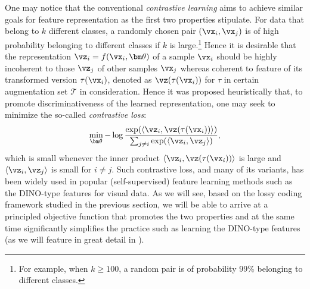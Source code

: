 \documentclass[../../book-main.tex]{subfiles}
\begin{document}
\begin{remark}
    One may notice that the conventional {\em contrastive learning}
    \citep{hadsell2006dimensionality,Van_den_Oord2018-qf,he2019momentum}
    aims to achieve similar goals for feature representation as the first
    two properties stipulate. For data that belong to $k$ different
    classes, a randomly chosen pair $(\vx_i, \vx_j)$ is of high probability
    belonging to different classes if $k$ is large.\footnote{For
        example, when $k \ge 100$, a random pair is of probability 99\%
    belonging to different classes.} Hence it is desirable that the
    representation $\vz_i = f(\vx_i, \bm \theta)$ of a sample $\vx_i$ should
    be highly incoherent to those $\vz_j$ of other samples $\vx_j$ whereas
    coherent to feature of its transformed version $\tau(\vx_i)$, denoted
    as $\vz(\tau(\vx_i))$ for $\tau$ in certain augmentation set $\mathcal
    T$ in consideration. Hence it was proposed heuristically that, to
    promote  discriminativeness of the learned representation, one may
    seek to minimize the so-called {\em contrastive loss}:
    \begin{equation}
        \min_{\bm \theta} - \log \frac{\exp(\langle \vz_i,
        \vz(\tau(\vx_i))\rangle)}{\sum_{j\not= i} \exp(\langle \vz_i,
        \vz_j\rangle)},
        \label{eqn:contrastive-loss}
    \end{equation}
    which is small whenever the inner product $\langle \vz_i,
    \vz(\tau(\vx_i))\rangle$ is large and $\langle \vz_i, \vz_j\rangle$ is
    small for $i \not= j$. Such contrastive loss, and many of its
    variants, has been widely used in popular (self-supervised) feature
    learning methods such as the DINO-type features
    \cite{caron2021unsupervisedlearningvisualfeatures,DINOv2} for visual
    data. As we will see, based on the lossy coding framework studied in
    the previous section, we will be able to arrive at a principled
    objective function that promotes the two properties and at the same
    time significantly simplifies the practice such as learning the
    DINO-type features (as we will feature in great detail in
    ).
\end{remark}
\end{document}

